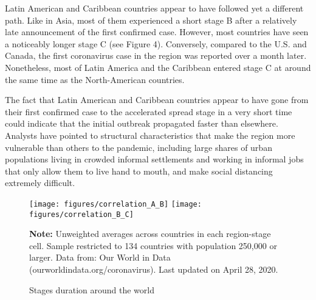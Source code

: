 \documentclass[12pt,english]{article}
\begin{document}
Latin American and Caribbean countries appear to have followed yet a different path. Like in Asia, most of them experienced a short stage B after a relatively late announcement of the first confirmed case. However, most countries have seen a noticeably longer stage C (see Figure 4).  Conversely, compared to the U.S. and Canada, the first coronavirus case in the region was reported over a month later.  Nonetheless, most of Latin America and the Caribbean entered stage C at around the same time as the North-American countries.

The fact that Latin American and Caribbean countries appear to have gone from their first confirmed case to the accelerated spread stage in a very short time could indicate that the initial outbreak propagated faster than elsewhere. Analysts have pointed to structural characteristics that make the region more vulnerable than others to the pandemic, including large shares of urban populations living in crowded informal settlements and working in informal jobs that only allow them to live hand to mouth, and make social distancing extremely difficult.

\begin{figure}[H]
	\singlespacing
	\centering
	 \caption{Stages duration around the world}  \label{fig:stage_by_region}
	\resizebox{0.7\width}{!} {
		\begin{threeparttable}
 			  \texttt{[image: figures/correlation\_A\_B]}
        \texttt{[image: figures/correlation\_B\_C]}
  			 \begin{tablenotes}[flushleft]\vspace*{-7bp}
			\item \textbf{Note:} Unweighted averages across countries in each region-stage cell. Sample restricted to 134 countries with population 250,000 or larger. Data from: Our World in Data (ourworldindata.org/coronavirus). Last updated on April 28, 2020.
			 \end{tablenotes}
  		\end{threeparttable}
 		}
  	 \onehalfspacing
\end{figure}
\end{document}
